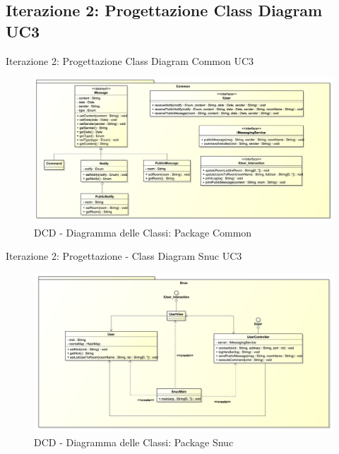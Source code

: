 \subsection{Iterazione 2: Progettazione Class Diagram UC3}
\begin{frame} {Iterazione 2: Progettazione Class Diagram Common UC3}
   \begin{figure}
     \includegraphics[scale=0.165]{image_astah/Iteration_2_DesignModel/ClassDiagramCommon.png}{\centering}
     \caption{DCD - Diagramma delle Classi: Package Common }
     \label{fig_UC3_DCD_1} 
   \end{figure}
\end{frame}

\begin{frame} {Iterazione 2: Progettazione - Class Diagram Snuc UC3}
   \begin{figure}
     \includegraphics[scale=0.16]{image_astah/Iteration_2_DesignModel/ClassDiagramSnuc.png}{\centering}
     \caption{DCD - Diagramma delle Classi: Package Snuc }
     \label{fig_UC3_DCD_3} 
   \end{figure}
\end{frame}

